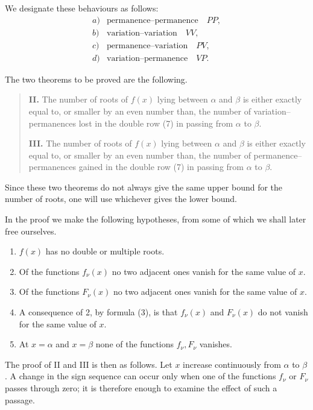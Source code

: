 \documentclass[11pt]{article}
\begin{document}
We designate these behaviours as follows:
\[
\begin{array}{ll}
a)&\text{permanence--permanence}\quad PP,\\
b)&\text{variation--variation}\quad VV,\\
c)&\text{permanence--variation}\quad PV,\\
d)&\text{variation--permanence}\quad VP.
\end{array}
\]

The two theorems to be proved are the following.

\begin{quote}
\textbf{II.} The number of roots of $f(x)$ lying between $\alpha$ and $\beta$ is either exactly equal to, or smaller by an even number than, the number of variation--permanences lost in the double row (7) in passing from $\alpha$ to $\beta$.

\textbf{III.} The number of roots of $f(x)$ lying between $\alpha$ and $\beta$ is either exactly equal to, or smaller by an even number than, the number of permanence--permanences gained in the double row (7) in passing from $\alpha$ to $\beta$.
\end{quote}

Since these two theorems do not always give the same upper bound for the number of roots, one will use whichever gives the lower bound.

In the proof we make the following hypotheses, from some of which we shall later free ourselves.
\begin{enumerate}[label=\arabic*.]
\item $f(x)$ has no double or multiple roots.
\item Of the functions $f_\nu(x)$ no two adjacent ones vanish for the same value of $x$.
\item Of the functions $F_\nu(x)$ no two adjacent ones vanish for the same value of $x$.
\item A consequence of 2, by formula (3), is that $f_\nu(x)$ and $F_\nu(x)$ do not vanish for the same value of $x$.
\item At $x=\alpha$ and $x=\beta$ none of the functions $f_\nu,F_\nu$ vanishes.
\end{enumerate}

The proof of II and III is then as follows. Let $x$ increase continuously from $\alpha$ to $\beta$. A change in the sign sequence can occur only when one of the functions $f_\nu$ or $F_\nu$ passes through zero; it is therefore enough to examine the effect of such a passage.
\end{document}
